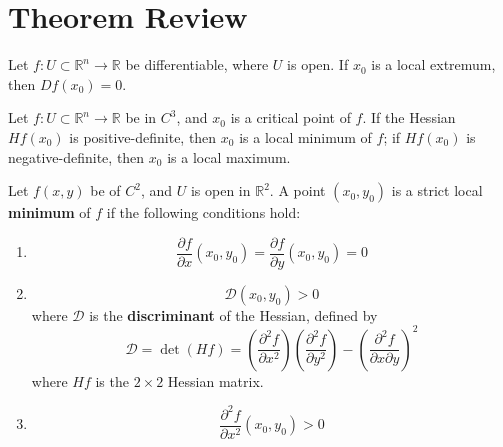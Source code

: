 \documentclass[openany]{book}
\newcommand{\R}{\mathbb{R}}
\begin{document}
\chapter{Theorem Review}



\begin{prop}
    Let $f:U\subset\R^n\to\R$ be differentiable, where $U$ is open. If $x_0$ is a local extremum, then $Df(x_0)=0$. 
\end{prop}


\begin{prop}[extremum]
    Let $f\colon U\subset\R^n\to\R$ be in $C^3$, and $x_0$ is a critical point of $f$. If the Hessian $Hf(x_0)$ is positive-definite, then $x_0$ is a local minimum of $f$; if $Hf(x_0)$ is negative-definite, then $x_0$ is a local maximum.
\end{prop}




\begin{prop}
    Let $f(x,y)$ be of $C^2$, and $U$ is open in $\R^2$. A point $(x_0,y_0)$ is a strict local \textbf{minimum} of $f$ if the following conditions hold:
    \begin{enumerate}
        \item \begin{equation*}
            \frac{\partial f}{\partial x}(x_0,y_0)=\frac{\partial f}{\partial y}(x_0,y_0)=0
        \end{equation*}
        \item \begin{equation*}
            \mathcal{D}(x_0,y_0)>0
        \end{equation*}
        where $\mathcal{D}$ is the \textbf{discriminant} of the Hessian, defined by 
        \begin{equation*}
            \mathcal{D}=\det (Hf)=\left(\frac{\partial^2 f}{\partial x^2}\right)\left(\frac{\partial^2 f}{\partial y^2}\right)-\left(\frac{\partial^2 f}{\partial x\partial y}\right)^2
        \end{equation*}
        where $Hf$ is the $2\times 2$ Hessian matrix.
        \item  \begin{equation*}
            \frac{\partial^2f}{\partial x^2}(x_0,y_0)>0
        \end{equation*}
    \end{enumerate}
\end{prop}
\end{document}
